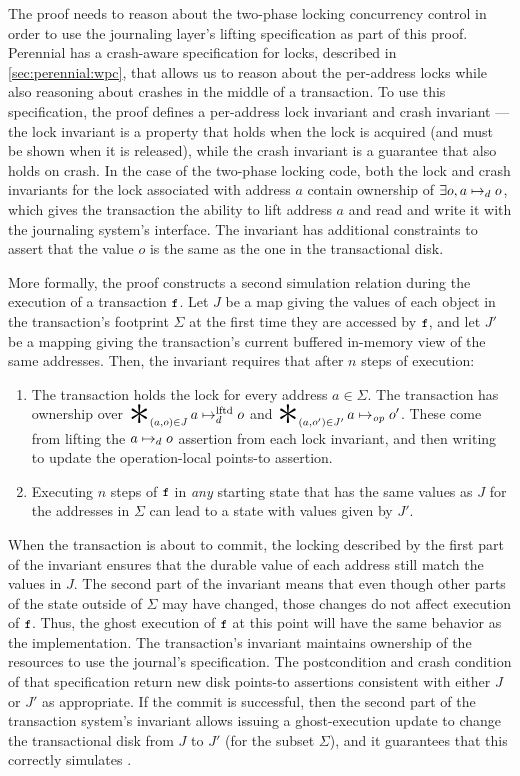 The proof needs to reason about the two-phase locking concurrency control in
order to use the journaling layer's lifting specification as part of this proof.
Perennial has a crash-aware specification for locks, described in
\cref{sec:perennial:wpc}, that allows us to reason about the per-address locks
while also reasoning about crashes in the middle of a transaction. To use this
specification, the proof defines a per-address lock invariant and crash
invariant --- the lock invariant is a property that holds when the lock is
acquired (and must be shown when it is released), while the crash invariant is a
guarantee that also holds on crash. In the case of the two-phase locking code,
both the lock and crash invariants for the lock associated with address $a$
contain ownership of $\exists o, a \mapsto_d o$, which gives the transaction
the ability to lift address $a$ and read and write it with the journaling
system's interface. The invariant has additional constraints to assert that the
value $o$ is the same as the one in the transactional disk.

More formally, the proof constructs a second simulation relation during the
execution of a transaction $\cc{f}$.  Let $J$ be a map giving the values of each
object in the transaction's footprint $\Sigma$ at the first time they are
accessed by $\cc{f}$, and let $J'$ be a mapping giving the transaction's current
buffered in-memory view of the same addresses.  Then, the invariant requires
that after $n$ steps of execution:
%
\begin{enumerate}

\item The transaction holds the lock for every address $a \in \Sigma$. The
transaction has ownership over $\bigast_{(a,o) \in J} a \mapstoLftd o$ and
$\bigast_{(a,o') \in J'} a \mapstoOp o'$. These come from lifting the
$a \mapsto_d o$ assertion from each lock invariant, and then writing to update
the operation-local points-to assertion.

\item Executing $n$ steps of $\cc{f}$ in \emph{any} starting state that has the same
  values as $J$ for the addresses in $\Sigma$ can lead to a state with values given
  by $J'$.

\end{enumerate}
%
When the transaction is about to commit, the locking described by the first part of the
invariant ensures that the durable value of each address still match the values
in $J$. The second part of the invariant means that even though other
parts of the state outside of $\Sigma$ may have changed, those changes do not
affect execution of $\cc{f}$. Thus, the ghost execution of $\cc{f}$ at this point will
have the same behavior as the implementation. The transaction's invariant
maintains ownership of the resources to use the journal's 
specification. The postcondition and crash condition of that specification
return new disk points-to assertions consistent with either $J$ or $J'$ as
appropriate. If the commit is successful, then the second part of the
transaction system's invariant allows issuing a ghost-execution update to change
the transactional disk from $J$ to $J'$ (for the subset $\Sigma$), and it
guarantees that this correctly simulates .


